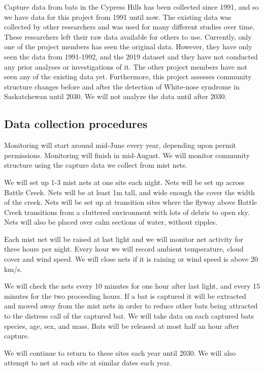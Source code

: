 \documentclass[]{article}
\begin{document}
Capture data from bats in the Cypress Hills has been collected since
1991, and so we have data for this project from 1991 until now. The
existing data was collected by other researchers and was used for many
different studies over time. These researchers left their raw data
available for others to use. Currently, only one of the project members
has seen the original data. However, they have only seen the data from
1991-1992, and the 2019 dataset and they have not conducted any prior
analyses or investigations of it. The other project members have not
seen any of the existing data yet. Furthermore, this project assesses
community structure changes before and after the detection of White-nose
syndrome in Saskatchewan until 2030. We will not analyze the data until
after 2030.

\hypertarget{data-collection-procedures}{%
\subsection{Data collection
procedures}\label{data-collection-procedures}}

Monitoring will start around mid-June every year, depending upon permit
permissions. Monitoring will finish in mid-August. We will monitor
community structure using the capture data we collect from mist nets.

We will set up 1-3 mist nets at one site each night. Nets will be set up
across Battle Creek. Nets will be at least 1m tall, and wide enough the
cover the width of the creek. Nets will be set up at transition sites
where the flyway above Battle Creek transitions from a cluttered
environment with lots of debris to open sky. Nets will also be placed
over calm sections of water, without ripples.

Each mist net will be raised at last light and we will monitor net
activity for three hours per night. Every hour we will record ambient
temperature, cloud cover and wind speed. We will close nets if it is
raining or wind speed is above 20 km/s.

We will check the nets every 10 minutes for one hour after last light,
and every 15 minutes for the two proceeding hours. If a bat is captured
it will be extracted and moved away from the mist nets in order to
reduce other bats being attracted to the distress call of the captured
bat. We will take data on each captured bats species, age, sex, and
mass. Bats will be released at most half an hour after capture.

We will continue to return to these sites each year until 2030. We will
also attempt to net at each site at similar dates each year.
\end{document}
